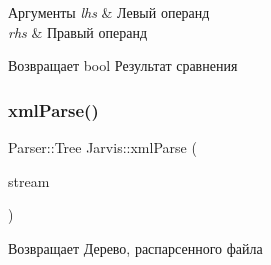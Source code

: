 \begin{DoxyParams}{Аргументы}
{\em lhs} & Левый операнд \\
\hline
{\em rhs} & Правый операнд \\
\hline
\end{DoxyParams}
\begin{DoxyReturn}{Возвращает}
bool Результат сравнения 
\end{DoxyReturn}
\mbox{\label{namespaceJarvis_aee6fb2e55e20f8df7e199e5adbe43fa1}} 
\subsubsection{\texorpdfstring{xml\+Parse()}{xmlParse()}}
{\footnotesize\ttfamily Parser\+::\+Tree Jarvis\+::xml\+Parse (\begin{DoxyParamCaption}\item[{Parser\+::string\+Target \&}]{stream }\end{DoxyParamCaption})}

\begin{DoxyReturn}{Возвращает}
Дерево, распарсенного файла 
\end{DoxyReturn}
